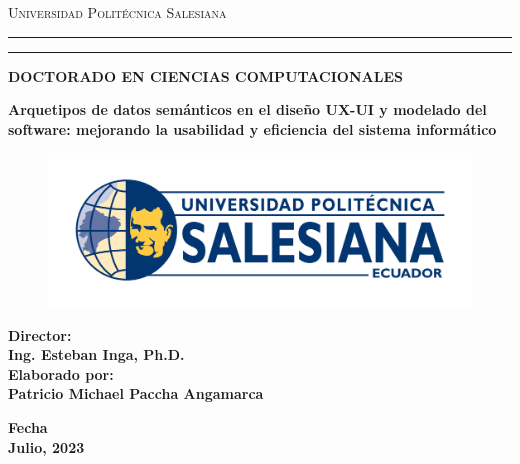 \newcommand\patTitulo
    {Arquetipos de datos semánticos en el diseño UX-UI y modelado del software: mejorando la usabilidad y eficiencia del sistema informático}
\newcommand\patTituloMayus
    {{\textsc \patTitulo}}
\newcommand\patNombre
    {Patricio Michael Paccha Angamarca}
\newcommand\patKeywords
    {Arquetipos de datos semánticos, diseño UX-UI, modelado de software, patrón de diseño de software}
\newcommand\patKeywordsIngles
    {Semantic data archetypes, UX-UI design, Software modeling, Software design pattern}

     \thispagestyle{empty}%
 \begin{titlepage}
    \begin{center}

{{\Large{\textsc{Universidad Politécnica Salesiana}}}} \rule[0.1cm]{16cm}{0.1mm}
\rule[0.5cm]{16cm}{0.6mm}
{\Large{\bf 
    DOCTORADO EN CIENCIAS COMPUTACIONALES 
}}
\end{center}
\vspace{15mm}
\begin{center}
{\LARGE{\bf 
    \patTituloMayus
}}\\
\vspace{6mm}
\end{center}
\vspace{22mm}
\par
\noindent

\begin{figure}
\begin{center}
\includegraphics[scale=0.3]{logoups.png}
\vspace{-0.2cm} 
\end{center}
\end{figure}


\begin{minipage}[t]{0.57\textwidth}
{\large{\bf Director:\\
    Ing. Esteban Inga, Ph.D. \\
{\vskip 5mm} Elaborado por:\\
    \patNombre
}}
\end{minipage}
\hfill
\vspace{10mm}
\begin{center}
{\large{\bf 
    Fecha\\
    Julio, 2023 }}%
\end{center}
\end{titlepage}
